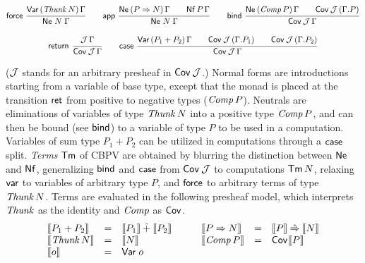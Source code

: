 \documentclass[a4paper]{easychair}
\renewcommand{\patom}{\ensuremath{o}}
\begin{document}
\begin{small}
\begin{gather*}
  \nru{\tforce}{\VarP {\Thunk N} \Gamma}{\Ne N \Gamma}
\qquad
  \nru{\tapp}
      {\NeP {P \To N} \Gamma \qquad \PValNf P \Gamma}
      {\Ne N \Gamma}
\qquad
  \nru{\tbind}
      {\NeP {\Comp P} \Gamma \qquad \Cover \J (\cext \Gamma P)}
      {\Cover \J \Gamma}
\\[2ex]
  \nru{\treturn}{\J\,\Gamma}{\Cover \J \Gamma}
\qquad
  \nru{\tcase}
      {\VarP {P_1 + P_2} \Gamma
       \qquad \Cover \J (\cext \Gamma {P_1})
       \qquad \Cover \J (\cext \Gamma {P_2})
      }
      {\Cover \J \Gamma}
\end{gather*}
\end{small}
\noindent
($\mathcal{J}$ stands for an arbitrary presheaf in $\mathsf{Cov}^{}\,\mathcal{J}$.)
Normal forms are introductions starting from a variable of base type,
except that the monad is placed at the
transition $\mathsf{ret}$ from positive to negative types ($\mathit{Comp}\,P$).
Neutrals are eliminations of variables of type $\mathit{Thunk}\,N$ into a
positive type $\mathit{Comp}\,P$, and can then be bound (see $\mathsf{bind}$)
to a variable of type $P$ to be used in a computation.  Variables of
sum type $P_1 + P_2$ can be utilized in computations through a
$\mathsf{case}$ split.
\emph{Terms} $\mathsf{Tm}$ of CBPV are obtained by blurring the
distinction between $\mathsf{Ne}^{}$ and $\mathsf{Nf}$,
generalizing $\mathsf{bind}$ and $\mathsf{case}$ from $\mathsf{Cov}^{}\,\mathcal{J}$ to
computations $\mathsf{Tm}\,N$,
relaxing $\mathsf{var}$ to variables
of arbitrary type $P$, and $\mathsf{force}$ to arbitrary terms of type
$\mathit{Thunk}\,N$.  Terms are evaluated in the following presheaf model,
which interprets $\mathit{Thunk}$ as the identity and $\mathit{Comp}$ as $\mathsf{Cov}^{}$.
\[
\begin{array}[t]{lcl}
  \den{P_1 + P_2} & = & \den{P_1} \hatplus \den{P_2} \\
  \den{\Thunk N} & = & \den N \\
  \den{\patom} & = & \tVar\;\patom \\
\end{array}
\qquad
\begin{array}[t]{lcl}
  \den{P \To N} & = & \den P \hatto \den N \\
  \den{\Comp P} & = & \Cov \den P \\
\end{array}
\]
\end{document}
